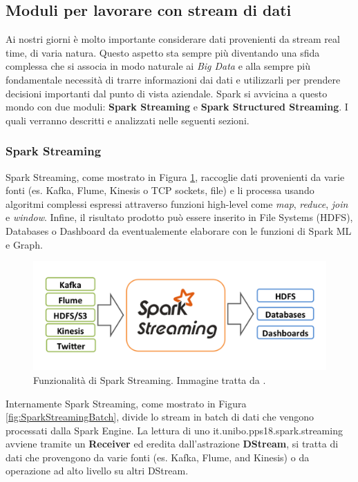 \documentclass[12pt,italian]{article}
\begin{document}
\subsection{Moduli per lavorare con stream di dati}
Ai nostri giorni è molto importante considerare dati provenienti da stream real time, di varia natura. Questo aspetto sta sempre più diventando una sfida complessa che si associa in modo naturale ai \textit{Big Data} e alla sempre più fondamentale necessità di trarre informazioni dai dati e utilizzarli per prendere decisioni importanti dal punto di vista aziendale. \newline
Spark si avvicina a questo mondo con due moduli: \textbf{Spark Streaming} e \textbf{Spark Structured Streaming}. I quali verranno descritti e analizzati nelle seguenti sezioni.
\subsubsection{Spark Streaming}
Spark Streaming, come mostrato in Figura \ref{fig:SparkStreaming}, raccoglie dati provenienti da varie fonti (es. Kafka, Flume, Kinesis o TCP sockets, file) e li processa usando algoritmi complessi espressi attraverso funzioni high-level come \textit{map}, \textit{reduce}, \textit{join} e \textit{window}. Infine, il risultato prodotto può essere inserito in File Systems (HDFS), Databases o Dashboard da eventualemente elaborare con le funzioni di Spark ML e Graph.
\begin{figure}[H]
	\centering 
	\includegraphics[width=1\linewidth]{img/sparkStreaming.png}
	\caption{Funzionalità di Spark Streaming. Immagine tratta da \cite{spark}.}
	\label{fig:SparkStreaming}
\end{figure}
\par Internamente Spark Streaming, come mostrato in  Figura \ref{fig:SparkStreamingBatch}, divide lo stream in batch di dati che vengono processati dalla Spark Engine.
\newline
La lettura di uno it.unibo.pps18.spark.streaming avviene tramite un \textbf{Receiver} ed eredita dall'astrazione \textbf{DStream}, si tratta di dati che provengono da varie fonti (es. Kafka, Flume, and Kinesis) o da operazione ad alto livello su altri DStream.
\end{document}
